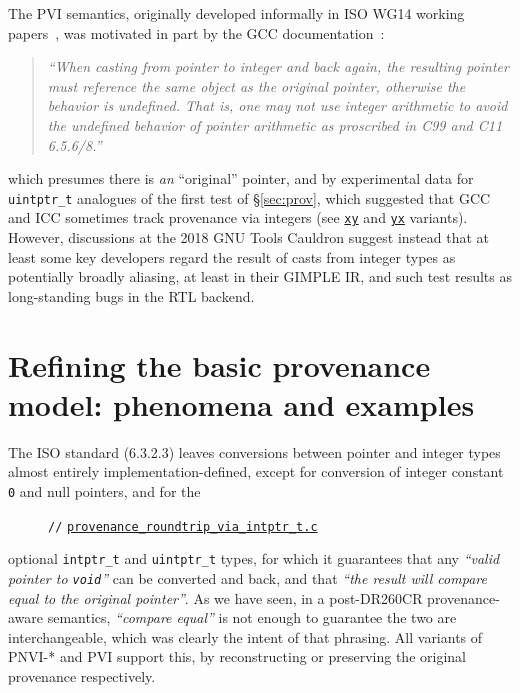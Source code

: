\documentclass[acmsmall,review,screen]{acmart}\settopmatter{printfolios=true,printccs=false,printacmref=false}
\newcommand{\myparagraph}[1]{\vspace{0.5\baselineskip}\par\noindent{\normalsize\bfseries{#1}}\quad}
\newcommand{\mytesturl}[1]{https://cerberus.cl.cam.ac.uk/cerberus?defacto/#1}
\newcommand{\mytestlink}[2]{\href{\mytesturl{#1}}{#2}}
\newcommand{\mylsttestlink}[1]{\mytestlink{#1}{\lstinline{#1}}}
\newcommand{\mylistingmargin}{5mm}
\newcommand{\myfooexamplename}[1]{\mylsttestlink{#1}}
\newcommand{\myfooexample}[3]{{\vspace*{-0.5\baselineskip}\par{\noindent\small\hspace*{\mylistingmargin}\lstinline{//} \mylsttestlink{#2}\vspace*{0.25\baselineskip}\par}}}
\begin{document}
The PVI semantics, originally developed
informally in ISO WG14 working papers~\cite{N2090,N2263}, 
was motivated in part by 
the GCC documentation~\cite{gcc-arrays}:
\begin{quote}
\emph{``When casting from pointer to integer and back again, the
    resulting pointer must reference the same object as the original
    pointer, otherwise the behavior is undefined. That is, one may
    not use integer arithmetic to avoid the undefined behavior of
    pointer arithmetic as proscribed in C99 and C11 6.5.6/8.''}
\end{quote}
which presumes there is \emph{an} ``original'' pointer, and by experimental data for 
\lstinline{uintptr_t} analogues of the first test of \S\ref{sec:prov},
which suggested that GCC and ICC sometimes track provenance via
integers
(see \mytestlink{provenance_basic_using_uintptr_t_global_xy.c}{\lstinline{xy}} and
\mytestlink{provenance_basic_using_uintptr_t_global_yx.c}{\lstinline{yx}}
variants). 
However, discussions at the 2018 GNU Tools Cauldron suggest instead
that at least some key developers regard
the result of casts from integer types as potentially broadly
aliasing, at least in their GIMPLE IR, and such test results as long-standing
bugs in the RTL backend.


\newpage

\section{Refining the basic provenance model: phenomena and examples}

\myparagraph{Pointer/integer casts}
The ISO standard (6.3.2.3) leaves conversions between pointer and integer types
almost entirely implementation-defined, except for conversion of
integer constant \texttt{0} and null pointers, and for the
\begin{figure}
{\renewcommand{\mylistingmargin}{0mm}\myfooexample{charon_tests}{provenance_roundtrip_via_intptr_t.c}{}%
}
\vspace*{-2\baselineskip}
\end{figure}
optional \lstinline{intptr_t} and \lstinline{uintptr_t} types, for
which it guarantees that any \emph{``valid pointer to \lstinline{void}''} can
be converted and back, and that \emph{``the result will compare equal to the
original pointer''}.  As we have seen, in a post-DR260CR
provenance-aware semantics, \emph{``compare equal''} is not enough to
guarantee the two are interchangeable, which was clearly the intent of
that phrasing.  All variants of PNVI-* and PVI  support this, by 
reconstructing or preserving the original provenance respectively.
\end{document}

